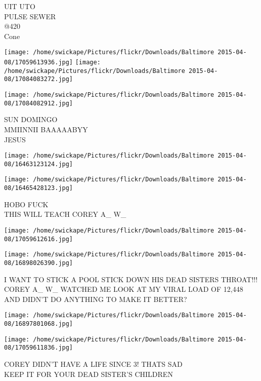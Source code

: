\documentclass[10pt,letterpaper]{article}
\begin{document}
UIT UTO\\
PULSE SEWER\\
@420\\
Cone\\
\pagebreak

\texttt{[image: /home/swickape/Pictures/flickr/Downloads/Baltimore 2015-04-08/17059613936.jpg]}
\texttt{[image: /home/swickape/Pictures/flickr/Downloads/Baltimore 2015-04-08/17084083272.jpg]}

\vspace{0.25in}
\texttt{[image: /home/swickape/Pictures/flickr/Downloads/Baltimore 2015-04-08/17084082912.jpg]}

SUN DOMINGO\\
MMIINNII BAAAAABYY\\
JESUS\\
\pagebreak

\texttt{[image: /home/swickape/Pictures/flickr/Downloads/Baltimore 2015-04-08/16463123124.jpg]}

\vspace{0.25in}
\texttt{[image: /home/swickape/Pictures/flickr/Downloads/Baltimore 2015-04-08/16465428123.jpg]}

HOBO FUCK\\
THIS WILL TEACH COREY A\_ W\_\\
\pagebreak

\texttt{[image: /home/swickape/Pictures/flickr/Downloads/Baltimore 2015-04-08/17059612616.jpg]}

\vspace{0.25in}
\texttt{[image: /home/swickape/Pictures/flickr/Downloads/Baltimore 2015-04-08/16898026390.jpg]}

I WANT TO STICK A POOL STICK DOWN HIS DEAD SISTERS THROAT!!!\\
COREY A\_ W\_ WATCHED ME LOOK AT MY VIRAL LOAD OF 12,448 AND DIDN'T DO ANYTHING TO MAKE IT BETTER?\\
\pagebreak

\texttt{[image: /home/swickape/Pictures/flickr/Downloads/Baltimore 2015-04-08/16897801068.jpg]}

\vspace{0.25in}
\texttt{[image: /home/swickape/Pictures/flickr/Downloads/Baltimore 2015-04-08/17059611836.jpg]}

COREY DIDN'T HAVE A LIFE SINCE 3!  THATS SAD\\
KEEP IT FOR YOUR DEAD SISTER'S CHILDREN\\
\pagebreak
\end{document}

